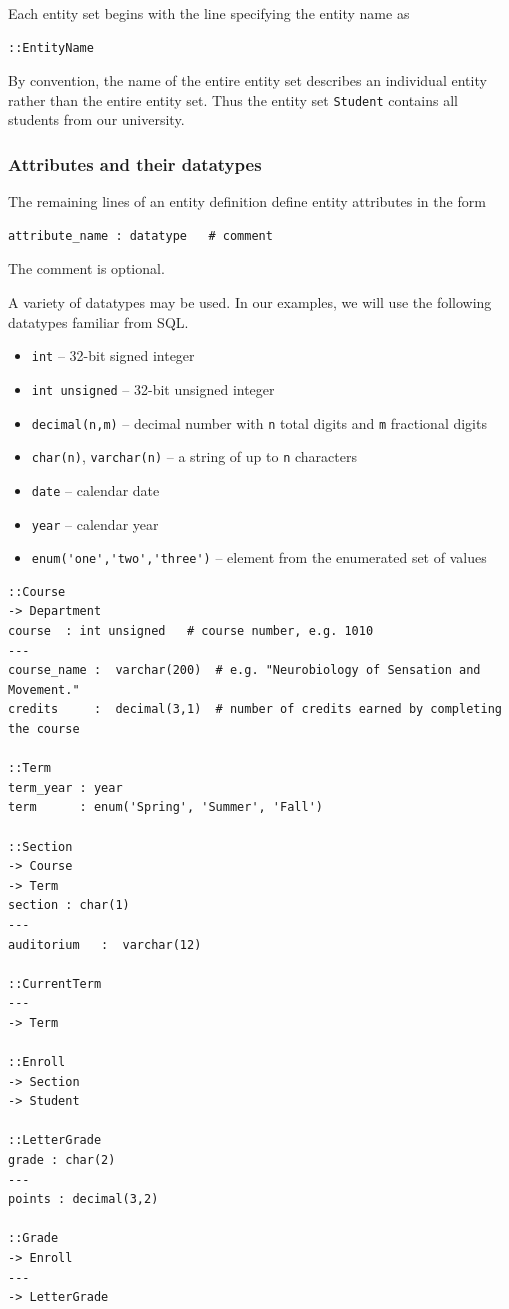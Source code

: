 \documentclass[letter,10pt]{article}
\begin{document}
Each entity set begins with the line specifying the entity name as 
\begin{lstlisting}[language=dj]
::EntityName 
\end{lstlisting}

By convention, the name of the entire entity set describes an individual entity rather than the entire entity set.  
Thus the entity set {\tt Student} contains all students from our university. 

\subsubsection{Attributes and their datatypes}
The remaining lines of an entity definition define entity attributes in the form
\begin{lstlisting}[language=dj]
attribute_name : datatype   # comment
\end{lstlisting}
The comment is optional.

A variety of datatypes may be used.  In our examples, we will use the following datatypes familiar from SQL.
\begin{itemize}
\item \lstinline$int$ -- 32-bit signed integer 
\item \lstinline$int unsigned$ -- 32-bit unsigned integer
\item \lstinline$decimal(n,m)$ -- decimal number with {\tt n} total digits and {\tt m} fractional digits
\item \lstinline$char(n)$, \lstinline$varchar(n)$ -- a string of up to {\tt n} characters
\item \lstinline$date$ -- calendar date
\item \lstinline$year$ -- calendar year 
\item \lstinline$enum('one','two','three')$ -- element from the enumerated set of values
\end{itemize}

\begin{lstfloat*}
\begin{lstlisting}[language=dj,caption={University database schema definition (Part 2).}, label={lst:uni2}]
::Course     
-> Department
course  : int unsigned   # course number, e.g. 1010
---
course_name :  varchar(200)  # e.g. "Neurobiology of Sensation and Movement."
credits     :  decimal(3,1)  # number of credits earned by completing the course

::Term
term_year : year 
term      : enum('Spring', 'Summer', 'Fall')

::Section 
-> Course
-> Term 
section : char(1)
---
auditorium   :  varchar(12)

::CurrentTerm
---
-> Term

::Enroll
-> Section
-> Student 

::LetterGrade
grade : char(2)
---
points : decimal(3,2)

::Grade 
-> Enroll
---
-> LetterGrade

\end{lstlisting}
\end{lstfloat*}
\end{document}
